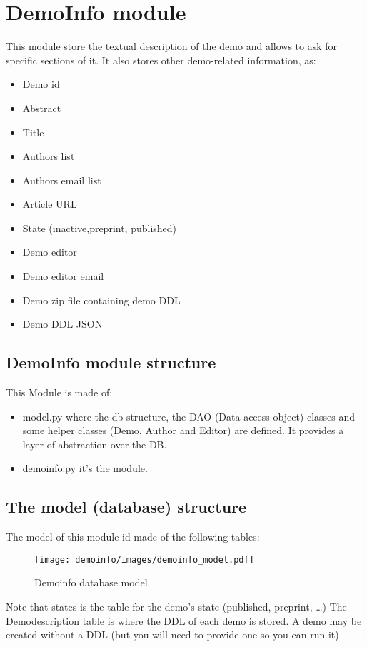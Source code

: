 \section{DemoInfo module}
This module store the textual description of the demo and allows to ask for specific sections of it. It also stores other demo-related information, as:
\begin{itemize}
\item Demo id
\item Abstract
\item Title 
\item Authors list
\item Authors email list
\item Article URL
\item State (inactive,preprint, published)
\item Demo editor
\item Demo editor email
\item Demo zip file containing demo DDL 
\item Demo DDL JSON
\end{itemize}

\subsection{DemoInfo module structure}
This Module is made of:
\begin{itemize}
  \item model.py where the db structure, the DAO (Data access object) classes and some helper classes (Demo, Author and Editor) are defined. It provides a layer of abstraction over the DB.
  \item demoinfo.py it's the module.
\end{itemize}

\subsection{The model (database) structure}
The model of this module id made of the following tables:

\begin{figure}[!ht]
    \centering
    \texttt{[image: demoinfo/images/demoinfo\_model.pdf]}
    \caption{Demoinfo database model.}
    \label{fig:demoinfo_model}
\end{figure}

Note that states is the table for the demo's state (published, preprint, \dots)
The Demodescription table is where the DDL of each demo is stored.
A demo may be created without a DDL (but you will need to provide one so you can run it)

